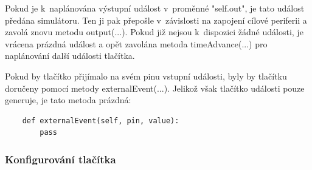 Pokud je k~naplánována výstupní událost v~proměnné "self.out", je tato událost předána simulátoru. Ten ji pak přepošle v~závislosti na zapojení cílové periferii a zavolá znovu metodu output(...). Pokud již nejsou k~dispozici žádné události, je vrácena prázdná událost a opět zavolána metoda timeAdvance(...) pro naplánování další události tlačítka.

Pokud by tlačítko přijímalo na svém pinu vstupní události, byly by tlačítku doručeny pomocí metody externalEvent(...). Jelikož však tlačítko události pouze generuje, je tato metoda prázdná:

\begin{lstlisting}
	def externalEvent(self, pin, value):
		pass
\end{lstlisting}

\subsubsection{Konfigurování tlačítka}

